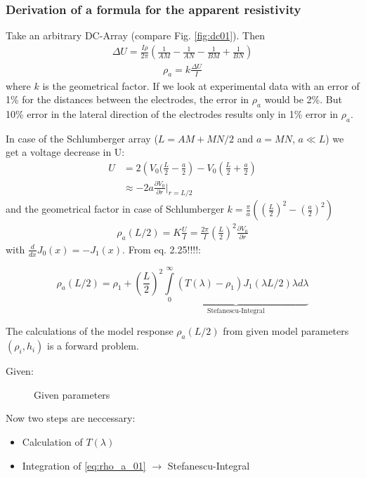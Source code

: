 \subsubsection{Derivation of a formula for the apparent resistivity}
Take an arbitrary DC-Array (compare Fig. \ref{fig:dc01}). Then
\begin{align*}
\Delta U=\frac{I\rho}{2\pi}\left(\frac{1}{AM}-\frac{1}{AN}-\frac{1}{BM}+\frac{1}{BN}\right)
\end{align*}
\begin{align*}
\rho_a=k\frac{\Delta U}{I}
\end{align*}
where $k$ is the geometrical factor.
If we look at experimental data with an error of 1\% for the distances between the electrodes, the error in $\rho_a$ would be 2\%. But 10\% error in the lateral direction of the electrodes results only in 1\% error in $\rho_a$.

In case of the Schlumberger array ($L=AM+MN/2$ and $a=MN$, $a\ll L$) we get a voltage decrease in U:
\begin{align*}
U&=2\left(V_0(\frac{L}{2}-\frac{a}{2}\right)-V_0\left(\frac{L}{2}+\frac{a}{2}\right)\\
&\approx -2a\frac{\partial V_0}{\partial r}\bigg|_{r=L/2}
\end{align*}
and the geometrical factor in case of Schlumberger $k=\frac{\pi}{a}\left(\left(\frac{L}{2}\right)^2-\left(\frac{a}{2}\right)^2\right)$
\begin{align*}
\rho_a(L/2)=K\frac{U}{I}=\frac{2\pi}{I}\left(\frac{L}{2}\right)^2\frac{\partial V_0}{\partial r}
\end{align*}
with $\frac{d}{dx}J_0(x)=-J_1(x)$. From eq. 2.25!!!!:

\begin{equation}
\rho_a(L/2)=\rho_1+\left(\frac{L}{2}\right)^2\underbrace{\int\limits_{0}^{\infty}(T(\lambda)-\rho_1)J_1(\lambda L/2)\lambda d\lambda}_{\textrm{Stefanescu-Integral}} \label{eq:rho_a_01}
\end{equation}

The calculations of the model response $\rho_a(L/2)$ from given model parameters $(\rho_i,h_i)$ is a forward problem. 

Given:
\begin{figure}[h!]
\begin{center}
\caption{Given parameters}
\label{fig:forwardgiven}
\end{center}
\end{figure}

Now two steps are neccessary:
\begin{itemize}
\item Calculation of $T(\lambda)$
\item Integration of \eqref{eq:rho_a_01} $\rightarrow$ Stefanescu-Integral
\end{itemize}

